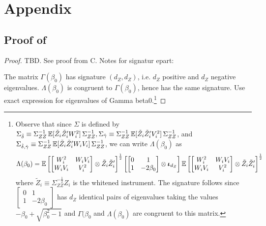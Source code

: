 \section{Appendix}


\subsection{Proof of\label{lem:bnh}}
\begin{proof}
    TBD. See proof from C. Notes for signatur epart:

    The matrix \(\Gamma(\beta_0)\) has signature \((d_Z,d_Z)\), i.e. \(d_Z\) positive and \(d_Z\) negative eigenvalues.
\(\Lambda(\beta_0)\) is congruent to \(\Gamma(\beta_0)\), hence has the same signature. Use exact expression for eigenvalues of Gamma beta0.\footnote{Observe that since   \(\Sigma\) is defined by
    \(\Sigma_{\hat\delta} \equiv \Sigma_{ZZ}^{-1}\, \mathbb{E}[\tilde Z_i\tilde Z_i' W_i^2]\, \Sigma_{ZZ}^{-1},
\Sigma_{\hat\gamma} \equiv \Sigma_{ZZ}^{-1}\, \mathbb{E}[\tilde Z_i\tilde Z_i' V_i^2]\, \Sigma_{ZZ}^{-1}\), and 
\(\Sigma_{\hat\delta,\hat\gamma} \equiv \Sigma_{ZZ}^{-1}\, \mathbb{E}[\tilde Z_i\tilde Z_i' W_i V_i]\, \Sigma_{ZZ}^{-1}\),
we can write \(\Lambda(\beta_0)\) as
\begin{align*}
    \Lambda(\beta_0) = 
    \mathbb{E}\left[\begin{bmatrix}
        W_i^2   & W_iV_i \\
        W_iV_i  & V_i^2 
    \end{bmatrix} \otimes \tilde Z_i\tilde Z_i' \right]^{\frac{1}{2}}
    \left[\begin{bmatrix}
        0 & 1 \\ 
        1 & -2\beta_0 
    \end{bmatrix} \otimes \boldsymbol{\iota}_{d_Z}\right]
    \mathbb{E}\left[\begin{bmatrix}
        W_i^2   & W_iV_i \\
        W_iV_i  & V_i^2 
    \end{bmatrix} \otimes \tilde Z_i\tilde Z_i' \right]^{\frac{1}{2}}
\end{align*}
where \(\tilde Z_i \equiv \Sigma_{ZZ}^{-\frac{1}{2}}Z_i\) is the whitened instrument. The signature follows since \(\left[\begin{smallmatrix}
        0 & 1 \\ 
        1 & -2\beta_0 
    \end{smallmatrix}\right]\) has \(d_Z\) identical pairs of eigenvalues taking the values \(-\beta_0 + \sqrt{\beta_0^2-1}\) and \(\Gamma(\beta_0\) and \(\Lambda(\beta_0)\) are congruent to this matrix.
}
\end{proof}


